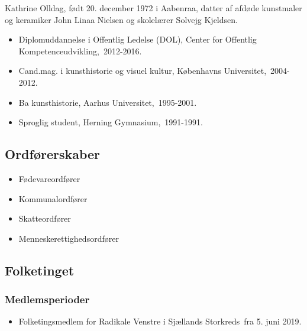 \documentclass[11pt, a4paper]{awesome-cv}
\begin{document}
\makecvheader[R]
\makelettertitle
\begin{cvletter}
Kathrine Olldag, født 20. december 1972 i Aabenraa, datter af afdøde kunstmaler og keramiker John Linaa Nielsen og skolelærer Solvejg Kjeldsen.

\begin{itemize}
\item Diplomuddannelse i Offentlig Ledelse (DOL), Center for Offentlig Kompetenceudvikling, 2012-2016.
\item Cand.mag. i kunsthistorie og visuel kultur, Københavns Universitet, 2004-2012.
\item Ba kunsthistorie, Aarhus Universitet, 1995-2001.
\item Sproglig student, Herning Gymnasium, 1991-1991.
\end{itemize}
\subsection*{Ordførerskaber}
\begin{itemize}
\item Fødevareordfører
\item Kommunalordfører
\item Skatteordfører
\item Menneskerettighedsordfører
\end{itemize}
\subsection*{Folketinget}
\subsubsection*{Medlemsperioder}
\begin{itemize}
\item Folketingsmedlem for Radikale Venstre i Sjællands Storkreds fra 5. juni 2019.
\end{itemize}

\end{cvletter}
\end{document}
